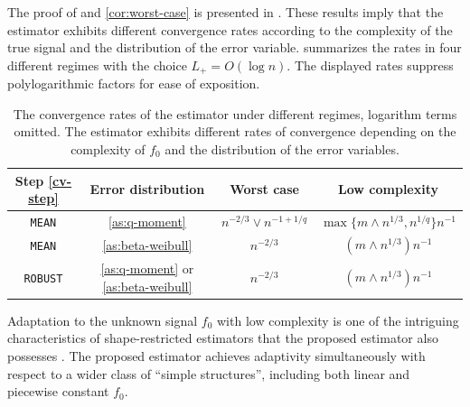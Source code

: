 \documentclass[12pt]{article}
\begin{document}
The proof of  and \ref{cor:worst-case} is presented in . These results imply that the estimator exhibits different convergence rates according to the complexity of the true signal and the distribution of the error variable.  summarizes the rates in four different regimes with the choice $L_+ = O(\log n)$. The displayed rates suppress polylogarithmic factors for ease of exposition.

\begin{table}
\renewcommand*{\arraystretch}{1.2}
\centering
\begin{tabular}{c c c c }
\hline 
Step \ref{cv-step} & Error distribution & Worst case & Low complexity     \\
\hline 
\texttt{MEAN} & \ref{as:q-moment}&  $n^{-2/3} \vee n^{-1+1/q}$        &  $\max\{m\wedge n^{1/3}, n^{1/q}\}n^{-1}$ \\
\texttt{MEAN} &  \ref{as:beta-weibull}  &$n^{-2/3} $  & $(m\wedge n^{1/3})n^{-1}$ \\
\texttt{ROBUST} &  \ref{as:q-moment} or \ref{as:beta-weibull}  &$n^{-2/3} $  & $(m\wedge n^{1/3})n^{-1}$ \\
 \hline 
\end{tabular}
\caption{The convergence rates of the estimator under different regimes, logarithm terms omitted. The estimator exhibits different rates of convergence depending on the complexity of $f_0$ and the distribution of the error variables.}\label{tab:convergence-rate}
\end{table}

Adaptation to the unknown signal $f_0$ with low complexity is one of the intriguing characteristics of shape-restricted estimators that the proposed estimator also possesses \citep{zhang2002risk, chatterjee2015risk, guntuboyina2018nonparametric, bellec2018sharp}. The proposed estimator achieves adaptivity simultaneously with respect to a wider class of ``simple structures'', including both linear and piecewise constant $f_0$.
\end{document}
